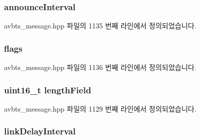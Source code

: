 \subsubsection[{\texorpdfstring{announce\+Interval}{announceInterval}}]{ announce\+Interval\hspace{0.3cm}{\ttfamily [private]}}\hypertarget{class_signalling_t_l_v_a23008bec6b65a37290ae2699115b40ce}{}\label{class_signalling_t_l_v_a23008bec6b65a37290ae2699115b40ce}


avbts\+\_\+message.\+hpp 파일의 1135 번째 라인에서 정의되었습니다.

\subsubsection[{\texorpdfstring{flags}{flags}}]{ flags\hspace{0.3cm}{\ttfamily [private]}}\hypertarget{class_signalling_t_l_v_aa2585d779da0ab21273a8d92de9a0ebe}{}\label{class_signalling_t_l_v_aa2585d779da0ab21273a8d92de9a0ebe}


avbts\+\_\+message.\+hpp 파일의 1136 번째 라인에서 정의되었습니다.

\subsubsection[{\texorpdfstring{length\+Field}{lengthField}}]{\setlength{\rightskip}{0pt plus 5cm}uint16\+\_\+t length\+Field\hspace{0.3cm}{\ttfamily [private]}}\hypertarget{class_signalling_t_l_v_a4dc83d7a14b4ddc8ba6051ab20ddcf1a}{}\label{class_signalling_t_l_v_a4dc83d7a14b4ddc8ba6051ab20ddcf1a}


avbts\+\_\+message.\+hpp 파일의 1129 번째 라인에서 정의되었습니다.

\subsubsection[{\texorpdfstring{link\+Delay\+Interval}{linkDelayInterval}}]{ link\+Delay\+Interval\hspace{0.3cm}{\ttfamily [private]}}\hypertarget{class_signalling_t_l_v_a9d82201fec4bc54ba5a9b690c2a927f4}{}\label{class_signalling_t_l_v_a9d82201fec4bc54ba5a9b690c2a927f4}


